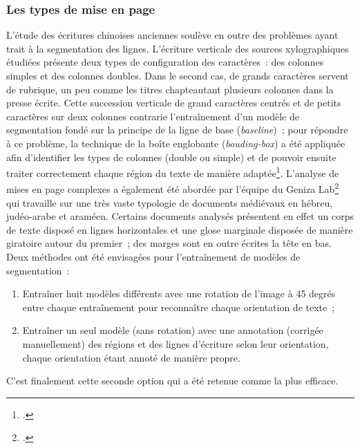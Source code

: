 \documentclass[a4paper,12pt,twoside]{book}
\begin{document}
				\subsubsection{Les types de mise en page}
				
				L'étude des écritures chinoises anciennes soulève en outre des problèmes
				ayant trait à la segmentation des lignes. L'écriture verticale des
				sources xylographiques étudiées présente deux types de configuration des
				caractères~: des colonnes simples et des colonnes doubles. Dans le
				second cas, de grands caractères servent de rubrique, un peu comme les
				titres chapteautant plusieurs colonnes dans la presse écrite. Cette
				succession verticale de grand caractères centrés et de petits caractères
				sur deux colonnes contrarie l'entraînement d'un modèle de segmentation
				fondé sur la principe de la ligne de base (\textit{baseline})~; pour
				répondre à ce problème, la technique de la boîte englobante
				(\textit{bouding-box}) a été appliquée afin d'identifier les types de
				colonnes (double ou simple) et de pouvoir ensuite traiter correctement
				chaque région du texte de manière adaptée\footcite{bizais-lilligExperimentationsPourAnalyse2022}. L'analyse de mises
				en page complexes a également été abordée par l'équipe du Geniza Lab\footcite{stoklbenezraSegmentationModeArchival2022} qui travaille sur une
				très vaste typologie de documents médiévaux en hébreu, judéo-arabe et
				araméen. Certains documents analysés présentent en effet un corps de
				texte disposé en lignes horizontales et une glose marginale disposée de
				manière giratoire autour du premier~; des marges sont en outre écrites
				la tête en bas. Deux méthodes ont été envisagées pour l'entraînement de
				modèles de segmentation~:
				
				\begin{enumerate}
					
					\item
					Entraîner huit modèles différents avec une rotation de l'image à 45
					degrés entre chaque entraînement pour reconnaître chaque orientation
					de texte~;
					\item
					Entraîner un seul modèle (sans rotation) avec une annotation (corrigée
					manuellement) des régions et des lignes d'écriture selon leur
					orientation, chaque orientation étant annoté de manière propre.
				\end{enumerate}
				
				C'est finalement cette seconde option qui a été retenue comme la plus
				efficace.
		
\end{document}
